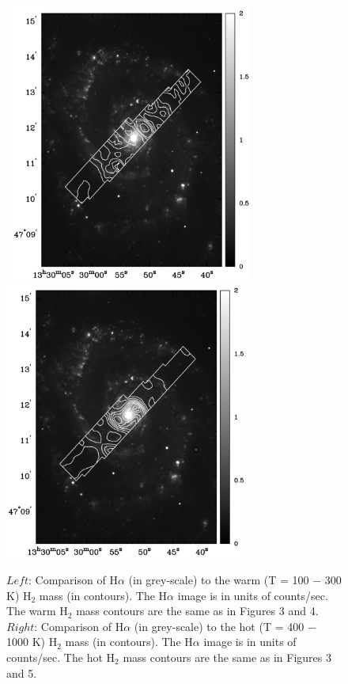 \documentclass[manuscript]{aastex}
\begin{document}
\begin{figure}[!h]
\centerline{\hbox{\hspace{0.0in}
\includegraphics[width=8cm,angle=0]{bw_cold_h2_ha.jpg}
\hspace{0.1in}
\includegraphics[width=8cm,angle=0]{new_bw_ha_v_hot.jpg}}}
\caption{$Left$: Comparison of  H$\alpha$ (in grey-scale) to the warm (T = 100 $-$ 300 K) $\mathrm{H_2}$ mass (in contours).  The H$\alpha$ image is in units of counts/sec. The warm $\mathrm{H_2}$ mass contours are the same as in Figures 3 and 4.  $Right$: Comparison of H$\alpha$ (in grey-scale) to the hot (T = 400 $-$ 1000 K) $\mathrm{H_2}$ mass (in contours).  The H$\alpha$ image is in units of counts/sec. The hot $\mathrm{H_2}$ mass contours are the same as in Figures 3 and 5.
\label{fig9}}
\end{figure}
\end{document}
